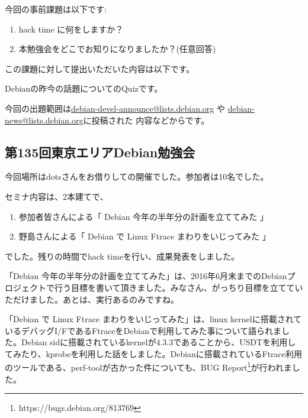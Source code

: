 \documentclass[mingoth,a4paper]{jsarticle}
\begin{document}

今回の事前課題は以下です:
\begin{enumerate}
\item hack time に何をしますか？
\item 本勉強会をどこでお知りになりましたか？(任意回答) 
\end{enumerate}
この課題に対して提出いただいた内容は以下です。
\begin{multicols}{2}
{\small

}
\end{multicols}


Debianの昨今の話題についてのQuizです。

今回の出題範囲は\url{debian-devel-announce@lists.debian.org} や \url{debian-news@lists.debian.org}に投稿された
内容などからです。

\begin{multicols}{2}

\end{multicols}



\subsection{第135回東京エリアDebian勉強会}

 今回場所はdotsさんをお借りしての開催でした。参加者は10名でした。

 セミナ内容は、2本建てで、
  \begin{enumerate}
  \item 参加者皆さんによる「 Debian 今年の半年分の計画を立ててみた 」
  \item 野島さんによる「 Debian で Linux Ftrace まわりをいじってみた  」
  \end{enumerate}
でした。残りの時間でhack timeを行い、成果発表をしました。

 「Debian 今年の半年分の計画を立ててみた」は、2016年6月末までのDebianプロジェクトで行う目標を書いて頂きました。みなさん、がっちり目標を立てていただけました。あとは、実行あるのみですね。

 「Debian で Linux Ftrace まわりをいじってみた」は、linux kernelに搭載されているデバッグI/FであるFtraceをDebianで利用してみた事について語られました。Debian sidに搭載されているkernelが4.3.3であることから、USDTを利用してみたり、kprobeを利用した話をしました。Debianに搭載されているFtrace利用のツールである、perf-toolが古かった件についても、BUG Report\footnote{https://bugs.debian.org/813769}が行われました。
\end{document}
